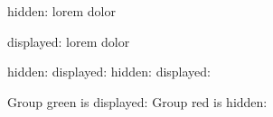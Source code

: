 


\tBeginVerbatim{}
\clozehide

hidden:  lorem  dolor
\tEndVerbatim

\tBeginVerbatim{}
\clozeshow

displayed: lorem  dolor
\tEndVerbatim

\tBeginVerbatim{}
\clozehide hidden: 
\clozeshow displayed: 
\clozehide hidden: 
\clozeshow displayed: 
\tEndVerbatim

\tBeginVerbatim{}

\clozeshow

\clozehide[red]

Group green is displayed: 
Group red is hidden: 
\tEndVerbatim

\tAll
\bye
